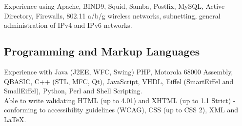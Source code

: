 \documentclass[a4paper, 11pt] {article}
\begin{document}
Experience using Apache, BIND9, Squid, Samba, Postfix, MySQL, Active 
Directory, Firewalls, 802.11 a/b/g wireless networks, subnetting, general
administration of IPv4 and IPv6 networks. 

\subsection*{Programming and Markup Languages}

Experience with Java (J2EE, WFC, Swing) PHP, Motorola 68000 Assembly, QBASIC, C++ 
(STL, MFC, Qt), JavaScript, VHDL, Eiffel (SmartEiffel and SmallEiffel),
Python, Perl and Shell Scripting. \\

Able to write validating HTML (up to 4.01) and XHTML (up 
to 1.1 Strict) - conforming to accessibility guidelines (WCAG), CSS (up to 
CSS 2), XML and LaTeX.
\end{document}
